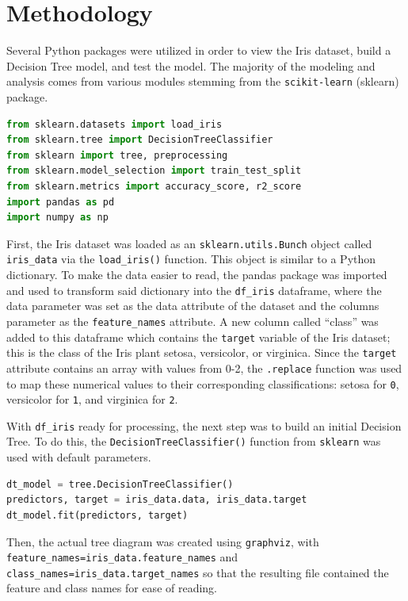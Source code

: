 \documentclass[journal]{IEEEtran}
\begin{document}
\section{Methodology}
Several Python packages were utilized in order to view the Iris dataset, build a Decision Tree model, and test the model. The majority of the modeling and analysis comes from various modules stemming from the \lstinline{scikit-learn} (sklearn) package.
\begin{lstlisting}[language=Python, caption=Libraries used for this assignment.]
from sklearn.datasets import load_iris
from sklearn.tree import DecisionTreeClassifier
from sklearn import tree, preprocessing
from sklearn.model_selection import train_test_split
from sklearn.metrics import accuracy_score, r2_score
import pandas as pd 
import numpy as np
\end{lstlisting}

First, the Iris dataset was loaded as an \lstinline{sklearn.utils.Bunch} object called \lstinline{iris_data} via the \lstinline{load_iris()} function. This object is similar to a Python dictionary. To make the data easier to read, the pandas package was imported and used to transform said dictionary into the \lstinline{df_iris} dataframe, where the data parameter was set as the data attribute of the dataset and the columns parameter as the \lstinline{feature_names} attribute. A new column called “class” was added to this dataframe which contains the \lstinline{target} variable of the Iris dataset; this is the class of the Iris plant \textemdash setosa, versicolor, or virginica. Since the \lstinline{target} attribute contains an array with values from 0-2, the \lstinline{.replace} function was used to map these numerical values to their corresponding classifications: setosa for \lstinline{0}, versicolor for \lstinline{1}, and virginica for \lstinline{2}. 

With \lstinline{df_iris} ready for processing, the next step was to build an initial Decision Tree. To do this, the \lstinline{DecisionTreeClassifier()} function from \lstinline{sklearn} was used with default parameters.

\begin{lstlisting}[language=Python, caption=Building the Decision Tree]
dt_model = tree.DecisionTreeClassifier()
predictors, target = iris_data.data, iris_data.target
dt_model.fit(predictors, target)
\end{lstlisting}

Then, the actual tree diagram was created using \lstinline{graphviz}, with \lstinline{feature_names=iris_data.feature_names} and \lstinline{class_names=iris_data.target_names} so that the resulting file contained the feature and class names for ease of reading. 
\end{document}
